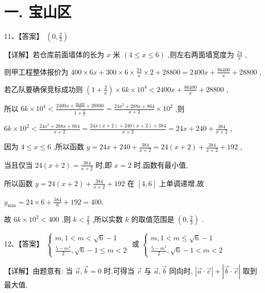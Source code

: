 \documentclass[10pt]{article}
\begin{document}
\section*{一. 宝山区}

11、【答案】 \(\left( {0,\frac{2}{3}}\right)\)

【详解】若仓库前面墙体的长为 \(x\) 米 \(\left( {4 \leq  x \leq  6}\right)\) ,则左右两面墙宽度为 \(\frac{24}{x}\) ,

则甲工程整体报价为 \({400} \times  {6x} + {300} \times  6 \times  \frac{24}{x} \times  2 + {28800} = {2400x} + \frac{86400}{x} + {28800}\) ,

若乙队要确保竞标成功则 \(\left( {1 + \frac{2}{x}}\right)  \times  {6k} \times  {10}^{4} < {2400x} + \frac{86400}{x} + {28800}\) ,

所以 \({6k} \times  {10}^{4} < \frac{{2400x} + \frac{86400}{x} + {28800}}{1 + \frac{2}{x}} = \frac{{24}{x}^{2} + {288x} + {864}}{x + 2} \times  {10}^{2}\) ,则

\({6k} \times  {10}^{2} < \frac{{24}{x}^{2} + {288x} + {864}}{x + 2} = \frac{{24x}\left( {x + 2}\right)  + {240}\left( {x + 2}\right)  + {384}}{x + 2} = {24x} + {240} + \frac{384}{x + 2}\) ,

因为 \(4 \leq  x \leq  6\) ,所以函数 \(y = {24x} + {240} + \frac{384}{x + 2} = {24}\left( {x + 2}\right)  + \frac{384}{x + 2} + {192}\) ,

当且仅当 \({24}\left( {x + 2}\right)  = \frac{384}{x + 2}\) 时,即 \(x = 2\) 时,函数有最小值,

所以函数 \(y = {24}\left( {x + 2}\right)  + \frac{384}{x + 2} + {192}\) 在 \(\left\lbrack  {4,6}\right\rbrack\) 上单调递增,故

\({y}_{\min } = {24} \times  6 + \frac{384}{6} + {192} = {400},\)

故 \({6k} \times  {10}^{2} < {400}\) ,则 \(k < \frac{2}{3}\) ,所以实数 \(k\) 的取值范围是 \(\left( {0,\frac{2}{3}}\right)\) .

12、【答案】 \(\left\{  \begin{array}{l} m,1 < m < \sqrt{6} - 1 \\  \frac{5 - {m}^{2}}{2},\sqrt{6} - 1 \leq  m < 2 \end{array}\right.\) 或 \(\left\{  \begin{array}{l} m,1 < m \leq  \sqrt{6} - 1 \\  \frac{5 - {m}^{2}}{2},\sqrt{6} - 1 < m < 2 \end{array}\right.\)

【详解】由题意有: 当 \(\overrightarrow{a},\overrightarrow{b} = 0\) 时,可得当 \(\overrightarrow{c}\) 与 \(\overrightarrow{a},\overrightarrow{b}\) 同向时, \(\left| {\overrightarrow{a} \cdot  \overrightarrow{c}}\right|  + \left| {\overrightarrow{b} \cdot  \overrightarrow{c}}\right|\) 取到最大值,
\end{document}

